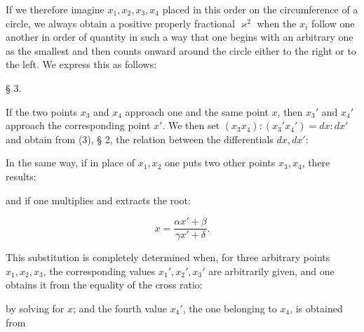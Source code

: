 If we therefore imagine $x_1, x_2, x_3, x_4$ placed in this order on the circumference of a circle, we always obtain a positive properly fractional $\varkappa^2$ when the $x_i$ follow one another in order of quantity in such a way that one begins with an arbitrary one as the smallest and then counts onward around the circle either to the right or to the left. We express this as follows:


§ 3. 

If the two points $x_3$ and $x_4$ approach one and the same point $x$, then $x_3'$ and $x_4'$ approach the corresponding point $x'$. We then set $(x_3x_4):(x_3'x_4') = dx:dx'$ and obtain from (3), § 2, the relation between the differentials $dx, dx'$:

In the same way, if in place of $x_1, x_2$ one puts two other points $x_3, x_4$, there results:

and if one multiplies and extracts the root:

\[
x = \frac{\alpha x' + \beta}{\gamma x' + \delta}.
\]

This substitution is completely determined when, for three arbitrary points $x_1, x_2, x_3$, the corresponding values $x_1', x_2', x_3'$ are arbitrarily given, and one obtains it from the equality of the cross ratio:

by solving for $x$; and the fourth value $x_4'$, the one belonging to $x_4$, is obtained from

